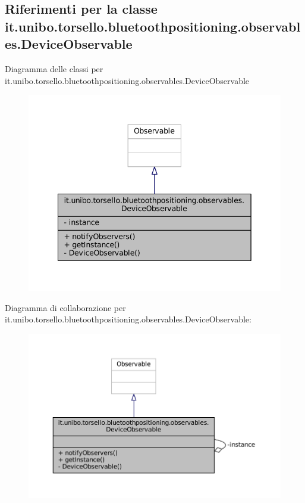 \hypertarget{classit_1_1unibo_1_1torsello_1_1bluetoothpositioning_1_1observables_1_1DeviceObservable}{}\subsection{Riferimenti per la classe it.\+unibo.\+torsello.\+bluetoothpositioning.\+observables.\+Device\+Observable}
\label{classit_1_1unibo_1_1torsello_1_1bluetoothpositioning_1_1observables_1_1DeviceObservable}


Diagramma delle classi per it.\+unibo.\+torsello.\+bluetoothpositioning.\+observables.\+Device\+Observable
\nopagebreak
\begin{figure}[H]
\begin{center}
\leavevmode
\includegraphics[width=342pt]{classit_1_1unibo_1_1torsello_1_1bluetoothpositioning_1_1observables_1_1DeviceObservable__inherit__graph}
\end{center}
\end{figure}


Diagramma di collaborazione per it.\+unibo.\+torsello.\+bluetoothpositioning.\+observables.\+Device\+Observable\+:
\nopagebreak
\begin{figure}[H]
\begin{center}
\leavevmode
\includegraphics[width=350pt]{classit_1_1unibo_1_1torsello_1_1bluetoothpositioning_1_1observables_1_1DeviceObservable__coll__graph}
\end{center}
\end{figure}
